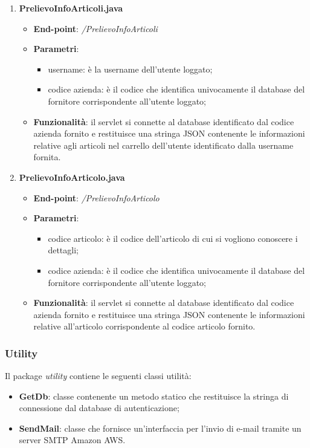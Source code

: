 \documentclass[12pt, a4paper, titlepage]{report}
\begin{document}
\begin{enumerate}
		\item \textbf{PrelievoInfoArticoli.java}
		\begin{itemize}
			\item \textbf{End-point}: \textit{/PrelievoInfoArticoli}
			\item \textbf{Parametri}:
			\begin{itemize}
				\item username: è la username dell'utente loggato;
				\item codice azienda: è il codice che identifica univocamente il database del fornitore corrispondente all'utente loggato;
			\end{itemize}
			\item \textbf{Funzionalità}: il servlet si connette al database identificato dal codice azienda fornito e restituisce una stringa JSON contenente le informazioni relative agli articoli nel carrello dell'utente identificato dalla username fornita.
		\end{itemize}
	
		\item \textbf{PrelievoInfoArticolo.java}
		\begin{itemize}
			\item \textbf{End-point}: \textit{/PrelievoInfoArticolo}
			\item \textbf{Parametri}:
			\begin{itemize}
				\item codice articolo: è il codice dell'articolo di cui si vogliono conoscere i dettagli;
				\item codice azienda: è il codice che identifica univocamente il database del fornitore corrispondente all'utente loggato;
			\end{itemize}
			\item \textbf{Funzionalità}: il servlet si connette al database identificato dal codice azienda fornito e restituisce una stringa JSON contenente le informazioni relative all'articolo corrispondente al codice articolo fornito.
		\end{itemize}
	\end{enumerate}
	
	\subsubsection{Utility}
	Il package \textit{utility} contiene le seguenti classi utilità:
	\begin{itemize}
		\item \textbf{GetDb}: classe contenente un metodo statico che restituisce la stringa di connessione dal database di autenticazione;
		\item \textbf{SendMail}: classe che fornisce un'interfaccia per l'invio di e-mail tramite un server SMTP Amazon AWS.
	\end{itemize}
	
\end{document}
